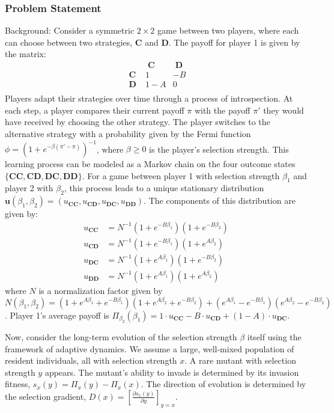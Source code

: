 \documentclass[10pt]{article}
\begin{document}
\subsubsection*{Problem Statement}
Background:
Consider a symmetric $2 \times 2$ game between two players, where each can choose between two strategies, $\mathbf{C}$ and $\mathbf{D}$. The payoff for player 1 is given by the matrix:
\begin{equation*}
	\begin{array}{c|cc}
		&\mathbf{\;C\;} &\mathbf{\;D\;}\\
		\hline
		\mathbf{\;C\;} &1 &-B \\
		\mathbf{\;D\;} &1-A &0 \\
	\end{array}
\end{equation*}
Players adapt their strategies over time through a process of introspection. At each step, a player compares their current payoff $\pi$ with the payoff $\pi'$ they would have received by choosing the other strategy. The player switches to the alternative strategy with a probability given by the Fermi function $\phi = (1+e^{-\beta(\pi'-\pi)})^{-1}$, where $\beta \ge 0$ is the player's selection strength. This learning process can be modeled as a Markov chain on the four outcome states $\{\mathbf{CC}, \mathbf{CD}, \mathbf{DC}, \mathbf{DD}\}$. For a game between player 1 with selection strength $\beta_1$ and player 2 with $\beta_2$, this process leads to a unique stationary distribution $\mathbf{u}(\beta_1, \beta_2) = (u_{\mathbf{CC}}, u_{\mathbf{CD}}, u_{\mathbf{DC}}, u_{\mathbf{DD}})$. The components of this distribution are given by:
\begin{align*}
u_{\mathbf{CC}} &= N^{-1} (1+e^{-B\beta_1})(1+e^{-B\beta_2}) \\
u_{\mathbf{CD}} &= N^{-1} (1+e^{-B\beta_1})(1+e^{A\beta_2}) \\
u_{\mathbf{DC}} &= N^{-1} (1+e^{A\beta_1})(1+e^{-B\beta_2}) \\
u_{\mathbf{DD}} &= N^{-1} (1+e^{A\beta_1})(1+e^{A\beta_2})
\end{align*}
where $N$ is a normalization factor given by $N(\beta_1, \beta_2) = (1+e^{A\beta_1}+e^{-B\beta_1})(1+e^{A\beta_2}+e^{-B\beta_2}) + (e^{A\beta_1}-e^{-B\beta_1})(e^{A\beta_2}-e^{-B\beta_2})$. Player 1's average payoff is $\Pi_{\beta_2}(\beta_1) = 1 \cdot u_{\mathbf{CC}} -B\cdot u_{\mathbf{CD}} +(1-A)\cdot u_{\mathbf{DC}}$.

Now, consider the long-term evolution of the selection strength $\beta$ itself using the framework of adaptive dynamics. We assume a large, well-mixed population of resident individuals, all with selection strength $x$. A rare mutant with selection strength $y$ appears. The mutant's ability to invade is determined by its invasion fitness, $s_x(y) = \Pi_x(y) - \Pi_x(x)$. The direction of evolution is determined by the selection gradient, $D(x) = \left[ \frac{\partial s_x(y)}{\partial y } \right]_{y=x}$.
\end{document}
